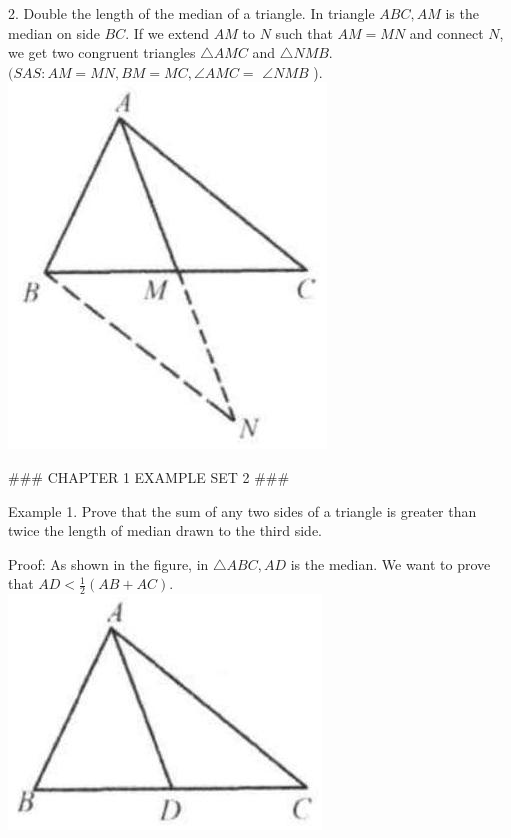 \documentclass[10pt]{article}
\begin{document}
2. Double the length of the median of a triangle.
In triangle \(A B C, A M\) is the median on side \(B C\). If we extend \(A M\) to \(N\) such that \(A M=M N\) and connect \(N\), we get two congruent triangles \(\triangle A M C\) and \(\triangle N M B\). \((S A S: A M=M N, B M=M C, \angle A M C=\) \(\angle N M B\) ).\\
\includegraphics[max width=\textwidth, center]{2025_04_17_97bc1f7e44d93c271a88g-023}

### CHAPTER 1 EXAMPLE SET 2 ###

Example 1. Prove that the sum of any two sides of a triangle is greater than twice the length of median drawn to the third side.

Proof:
As shown in the figure, in \(\triangle A B C, A D\) is the median. We want to prove that \(A D<\frac{1}{2}(A B+A C)\).\\
\includegraphics[max width=\textwidth, center]{2025_04_17_97bc1f7e44d93c271a88g-023(1)}
\end{document}
